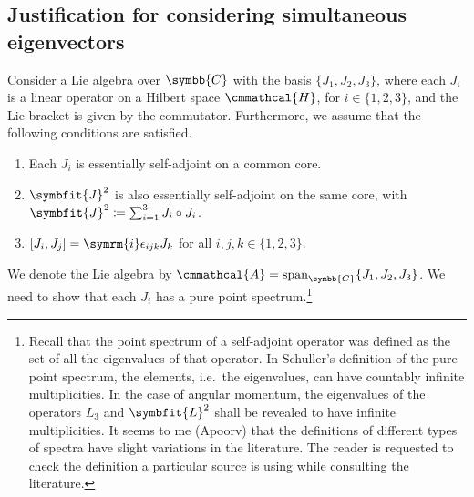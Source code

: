 \documentclass[12pt, a4 paper]{article}
\renewcommand{\symcal}{\cmmathcal}
\theoremstyle{definition}
\newcommand{\cc}{\symbb{C}}
\newcommand{\hilbert}{\symcal{H}}
\renewcommand{\i}{\symrm{i}}
\DeclareMathOperator{\spann}{span}
\begin{document}
    \subsection{Justification for considering simultaneous eigenvectors}

    Consider a Lie algebra over \(\cc\) with the basis \(\{J_1, J_2, J_3\}\), where each \(J_i\) is a linear operator on a Hilbert space \(\hilbert\), for \(i \in \{1, 2, 3\}\), and the Lie bracket is given by the commutator. Furthermore, we assume that the following conditions are satisfied.
    \begin{enumerate}
        \item Each \(J_i\) is essentially self-adjoint on a common core.
        \item \(\symbfit{J}^2\) is also essentially self-adjoint on the same core, with \(\symbfit{J}^2 \coloneq \sum_{i=1}^3 J_i \circ J_i\).
        \item \([J_i, J_j] = \i \epsilon_{ijk} J_k\) for all \(i, j, k \in \{1, 2, 3\}\).
    \end{enumerate}
    We denote the Lie algebra by \(\symcal{A} = \spann_{\cc}\{J_1, J_2, J_3\}\). We need to show that each \(J_i\) has a pure point spectrum.\footnote{Recall that the point spectrum of a self-adjoint operator was defined as the set of all the eigenvalues of that operator. In Schuller's definition of the pure point spectrum, the elements, i.e.\ the eigenvalues, can have countably infinite multiplicities. In the case of angular momentum, the eigenvalues of the operators \(L_3\) and \(\symbfit{L}^2\) shall be revealed to have infinite multiplicities. It seems to me (Apoorv) that the definitions of different types of spectra have slight variations in the literature. The reader is requested to check the definition a particular source is using while consulting the literature.}
\end{document}
